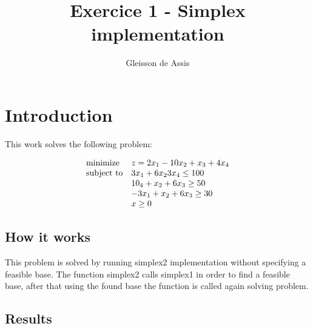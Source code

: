 \documentclass{article}
\begin{document}
\title{Exercice 1 - Simplex implementation}
\author{Gleisson de Assis}
\maketitle{}


\section{Introduction}
This work solves the following problem:

\begin{equation*}
\begin{array}{ll@{}ll}
\text{minimize}  & z = 2x_{1} - 10x_{2} + x_{3} + 4x_{4} &\\
\text{subject to}& 3x_{1} + 6x_{2}  3x_{4} \leq 100\\
                 & 10_{4} + x_{2} + 6x_{3} \geq 50\\
                 & -3x_{1} + x_{2} + 6x_{3} \geq 30\\
                 & x \geq 0
\end{array}
\end{equation*}

\subsection{How it works}
This problem is solved by running simplex2 implementation without specifying a
feasible base. The function simplex2 calls simplex1 in order to find a feasible base,
after that using the found base the function is called again solving
problem.

\subsection{Results}
\end{document}
